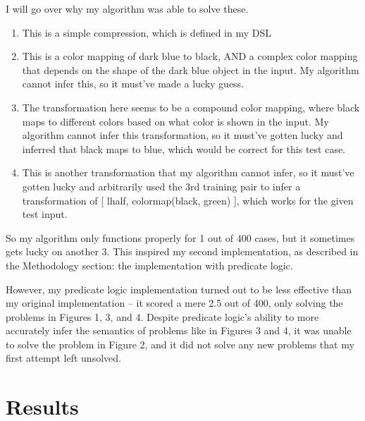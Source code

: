 \documentclass[letterpaper]{article} %
\begin{document}
\bigskip

I will go over why my algorithm was able to solve these.
\begin{enumerate}
    \item This is a simple compression, which is defined in my DSL
    \item This is a color mapping of dark blue to black, AND a complex color mapping that depends on the shape of the dark blue object in the input. My algorithm cannot infer this, so it must've made a lucky guess.
    \item The transformation here seems to be a compound color mapping, where black maps to different colors based on what color is shown in the input. My algorithm cannot infer this transformation, so it must've gotten lucky and inferred that black maps to blue, which would be correct for this test case.
    \item This is another transformation that my algorithm cannot infer, so it must've gotten lucky and arbitrarily used the 3rd training pair to infer a transformation of [ lhalf, colormap(black, green) ], which works for the given test input. 
\end{enumerate}

\bigskip

So my algorithm only functions properly for 1 out of 400 cases, but it sometimes gets lucky on another 3. This inspired my second implementation, as described in the Methodology section: the implementation with predicate logic.

\bigskip

However, my predicate logic implementation turned out to be less effective than my original implementation -- it scored a mere 2.5 out of 400,  only solving the problems in Figures 1, 3, and 4. Despite predicate logic's ability to more accurately infer the semantics of problems like in Figures 3 and 4, it was unable to solve the problem in Figure 2, and it did not solve any new problems that my first attempt left unsolved.

\section{Results}

\renewcommand{\arraystretch}{1.5} %
\setlength{\tabcolsep}{10pt}      %

\begin{table}[h!]
    \centering
    \caption{Results Table}
\end{table}
\end{document}

